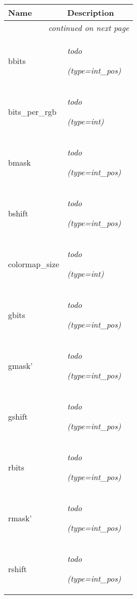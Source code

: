     \vspace{-1cm}
\hspace{\varindent}\begin{longtable}{|p{\varnamewidth}|p{\vardescrwidth}|l}
\cline{1-2}
\cline{1-2} \centering \textbf{Name} & \centering \textbf{Description}& \\
\cline{1-2}
\endhead\cline{1-2}\multicolumn{3}{r}{\small\textit{continued on next page}}\\\endfoot\cline{1-2}
\endlastfoot\raggedright b\-b\-i\-t\-s\- & \raggedright \emph{todo}

            {\it (type=int\_pos)}&\\
\cline{1-2}
\raggedright b\-i\-t\-s\-\_\-p\-e\-r\-\_\-r\-g\-b\- & \raggedright \emph{todo}

            {\it (type=int)}&\\
\cline{1-2}
\raggedright b\-m\-a\-s\-k\- & \raggedright \emph{todo}

            {\it (type=int\_pos)}&\\
\cline{1-2}
\raggedright b\-s\-h\-i\-f\-t\- & \raggedright \emph{todo}

            {\it (type=int\_pos)}&\\
\cline{1-2}
\raggedright c\-o\-l\-o\-r\-m\-a\-p\-\_\-s\-i\-z\-e\- & \raggedright \emph{todo}

            {\it (type=int)}&\\
\cline{1-2}
\raggedright g\-b\-i\-t\-s\- & \raggedright \emph{todo}

            {\it (type=int\_pos)}&\\
\cline{1-2}
\raggedright g\-m\-a\-s\-k\-'\- & \raggedright \emph{todo}

            {\it (type=int\_pos)}&\\
\cline{1-2}
\raggedright g\-s\-h\-i\-f\-t\- & \raggedright \emph{todo}

            {\it (type=int\_pos)}&\\
\cline{1-2}
\raggedright r\-b\-i\-t\-s\- & \raggedright \emph{todo}

            {\it (type=int\_pos)}&\\
\cline{1-2}
\raggedright r\-m\-a\-s\-k\-'\- & \raggedright \emph{todo}

            {\it (type=int\_pos)}&\\
\cline{1-2}
\raggedright r\-s\-h\-i\-f\-t\- & \raggedright \emph{todo}

            {\it (type=int\_pos)}&\\
\cline{1-2}
\end{longtable}

